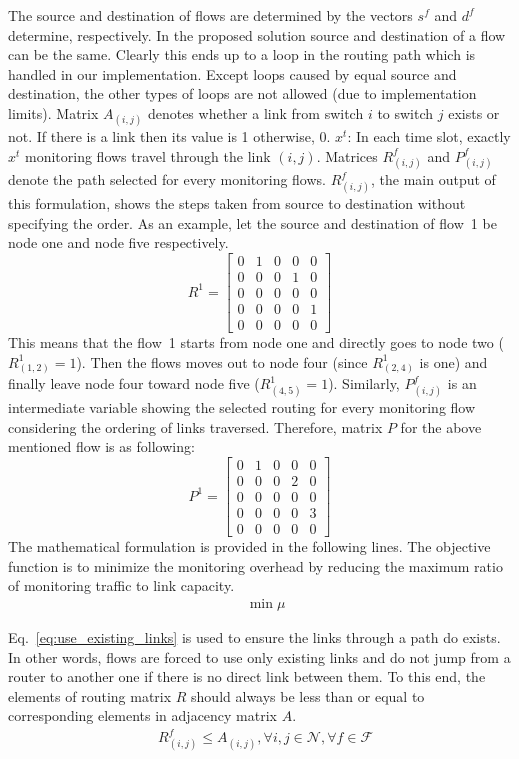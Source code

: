 \documentclass[10pt, journal, letterpaper]{IEEEtran}
\begin{document}
The source and destination of flows are determined by the vectors $s^f$ and $d^f$ determine, respectively. In the proposed solution source and destination of a flow can be the same. Clearly this ends up to a loop in the routing path which is handled in our implementation. Except loops caused by equal source and destination, the other types of loops are not allowed (due to implementation limits). Matrix $A_{(i,j)}$ denotes whether a link from switch $i$ to switch $j$ exists or not. If there is a link then its value is 1 otherwise, 0. $x^t$: In each time slot, exactly $x^t$ monitoring flows travel through the link $(i,j)$. Matrices $R^f_{(i,j)}$ and $P^f_{(i,j)}$ denote the path selected for every monitoring flows. $R^f_{(i,j)}$, the main output of this formulation, shows the steps taken from source to destination without specifying the order. As an example, let the source and destination of flow~1 be node one and node five respectively. 
\[R^1=
  \begin{bmatrix}
    0 & 1 & 0 & 0 & 0\\
    0 & 0 & 0 & 1 & 0\\
    0 & 0 & 0 & 0 & 0\\
    0 & 0 & 0 & 0 & 1\\
    0 & 0 & 0 & 0 & 0
  \end{bmatrix}\]
This means that the flow~1 starts from node one and directly goes to node two ($R^1_{(1,2)}=1$). Then the flows moves out to node four (since $R^1_{(2,4)}$ is one) and finally leave node four toward node five ($R^1_{(4,5)}=1$). Similarly, $P^f_{(i,j)}$ is an intermediate variable showing the selected routing for every monitoring flow considering the ordering of links traversed. Therefore, matrix $P$ for the above mentioned flow is as following:
\[P^1=
  \begin{bmatrix}
    0 & 1 & 0 & 0 & 0\\
    0 & 0 & 0 & 2 & 0\\
    0 & 0 & 0 & 0 & 0\\
    0 & 0 & 0 & 0 & 3\\
    0 & 0 & 0 & 0 & 0
  \end{bmatrix}\]
The mathematical formulation is provided in the following lines. The objective function is to minimize the monitoring overhead by reducing the maximum ratio of monitoring traffic to link capacity.
\begin{align}
    & \min{\mu}
\end{align}

Eq.~\ref{eq:use_existing_links} is used to ensure the links through a path do exists. In other words, flows are forced to use only existing links and do not jump from a router to another one if there is no direct link between them. To this end, the elements of routing matrix $R$ should always be less than or equal to corresponding elements in adjacency matrix $A$.
\begin{align}
    & R_{(i,j)}^f \leq A_{(i,j)}, \forall i, j \in \mathcal{N}, \forall f \in \mathcal{F} \label{eq:use_existing_links}
\end{align}
\end{document}
